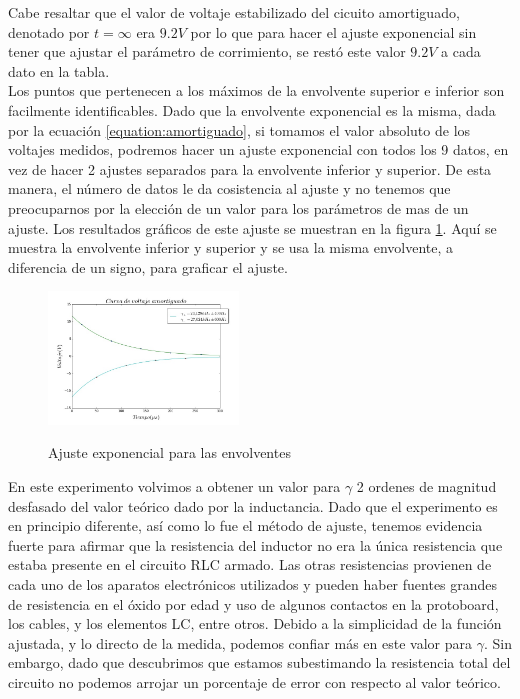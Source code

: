 \documentclass[%
 reprint,
 amsmath,amssymb,
 aps,
]{revtex4-1}
\begin{document}
Cabe resaltar que el valor de voltaje estabilizado del cicuito amortiguado, denotado por $t = \infty$ era $9.2 V$ por lo que para hacer el ajuste exponencial sin tener que ajustar el par\'ametro de corrimiento, se rest\'o este valor $9.2V$ a cada dato en la tabla.\\
  
Los puntos que pertenecen a los m\'aximos de la envolvente superior e inferior son facilmente identificables. Dado que la envolvente exponencial es la misma, dada por la ecuaci\'on \ref{equation:amortiguado}, si tomamos el valor absoluto de los voltajes medidos, podremos hacer un ajuste exponencial con todos los 9 datos, en vez de hacer 2 ajustes separados para la envolvente inferior y superior. De esta manera, el n\'umero de datos le da cosistencia al ajuste y no tenemos que preocuparnos por la elecci\'on de un valor para los par\'ametros de mas de un ajuste. Los resultados gr\'aficos de este ajuste se muestran en la figura \ref{fig:amortiguado}. Aqu\'i se muestra la envolvente inferior y superior y se usa la misma envolvente, a diferencia de un signo, para graficar el ajuste.\\

\begin{figure}[h]
\caption{Ajuste exponencial para las envolventes}
\centering
\includegraphics[width=0.45\textwidth]{amortiguado}
\label{fig:amortiguado}
\end{figure}

En este experimento volvimos a obtener un valor para $\gamma$ 2 ordenes de magnitud desfasado del valor te\'orico dado por la inductancia. Dado que el experimento es en principio diferente, as\'i como lo fue el m\'etodo de ajuste, tenemos evidencia fuerte para afirmar que la resistencia del inductor no era la \'unica resistencia que estaba presente en el circuito RLC armado. Las otras resistencias provienen de cada uno de los aparatos electr\'onicos utilizados y pueden haber fuentes grandes de resistencia en el \'oxido por edad y uso de algunos contactos en la protoboard, los cables, y los elementos LC, entre otros. Debido a la simplicidad de la funci\'on ajustada, y lo directo de la medida, podemos confiar m\'as en este valor para $\gamma$. Sin embargo, dado que descubrimos que estamos subestimando la resistencia total del circuito no podemos arrojar un porcentaje de error con respecto al valor te\'orico.
\end{document}

